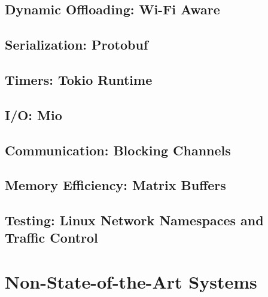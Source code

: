 \subsection{Dynamic Offloading: Wi-Fi Aware}
\subsection{Serialization: Protobuf}
\subsection{Timers: Tokio Runtime}
\subsection{I/O: Mio}
\subsection{Communication: Blocking Channels}
\subsection{Memory Efficiency: Matrix Buffers}
\subsection{Testing: Linux Network Namespaces and Traffic Control}

\section{Non-State-of-the-Art Systems}